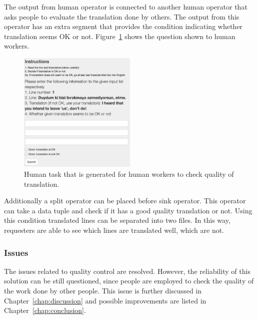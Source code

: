 The output from human operator is connected to another human operator that asks people to evaluate the translation done by others. The output from this operator has an extra segment that provides the condition indicating whether translation seems OK or not. Figure~\ref{fig:scenario2.2h} shows the question shown to human workers.

\begin{figure}[ht]
	\centering
	\includegraphics[width=0.5\textwidth]{figures/scenarios/scenario2_2h.png}
	\caption{Human task that is generated for human workers to check quality of translation.}
	\label{fig:scenario2.2h}
\end{figure}

Additionally a split operator can be placed before sink operator. This operator can take a data tuple and check if it has a good quality translation or not. Using this condition translated lines can be separated into two files. In this way, requesters are able to see which lines are translated well, which are not.

\subsubsection{Issues}
The issues related to quality control are resolved. However, the reliability of this solution can be still questioned, since people are employed to check the quality of the work done by other people. This issue is further discussed in Chapter~\ref{chap:discussion} and possible improvements are listed in Chapter~\ref{chap:conclusion}.